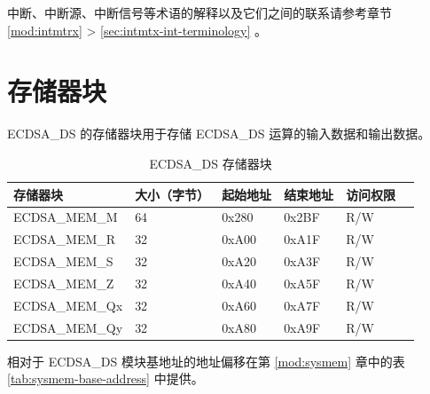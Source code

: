 \documentclass[main\_\_CN.tex]{subfiles}
\begin{document}
\begin{tiplisting}
中断、中断源、中断信号等术语的解释以及它们之间的联系请参考章节 \ref{mod:intmtrx} \textit{} > \ref{sec:intmtx-int-terminology} \textit{}。
\end{tiplisting}


\clearpage
\section{存储器块}
ECDSA\_DS 的存储器块用于存储 ECDSA\_DS 运算的输入数据和输出数据。

\begin{table}[H]
    \centering
    \caption{ECDSA\_DS 存储器块} \label{tab:ecdsa-memory}
    \begin{threeparttable}
    \begin{tabular}{ | l | l | l | l | l | l | }
    \hline
        \rowcolor{lightgray}
        \textbf{存储器块} & \textbf{大小（字节）}  &  \textbf{起始地址}\tnote{*} &  \textbf{结束地址} \tnote{*} & \textbf{访问权限}   \\ \hline
        ECDSA\_MEM\_M    & 64  & 0x280 & 0x2BF & R/W \\ \hline
        ECDSA\_MEM\_R    & 32  & 0xA00 & 0xA1F & R/W \\ \hline
        ECDSA\_MEM\_S    & 32  & 0xA20 & 0xA3F & R/W \\ \hline
        ECDSA\_MEM\_Z    & 32  & 0xA40 & 0xA5F & R/W \\ \hline
        ECDSA\_MEM\_Qx   & 32  & 0xA60 & 0xA7F & R/W \\ \hline
        ECDSA\_MEM\_Qy   & 32  & 0xA80 & 0xA9F & R/W \\ \hline
    \end{tabular}
    \begin{tablenotes}
        \item[*] 相对于 ECDSA\_DS 模块基地址的地址偏移在第 \ref{mod:sysmem} 章\textit{}中的表 \ref{tab:sysmem-base-address} 中提供。
    \end{tablenotes}
    \end{threeparttable}
\end{table}



\end{document}
